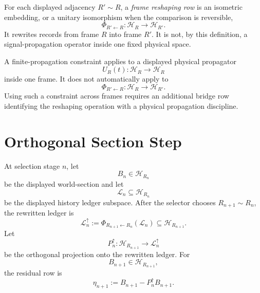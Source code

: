 \begin{definition}
\label{def:observer-centered-frame-reshaping-row}
For each displayed adjacency $R'\sim R$, a \emph{frame reshaping row} is
an isometric embedding, or a unitary isomorphism when the comparison is
reversible,
$$
\Phi_{R'\leftarrow R}:\mathcal H_R\to\mathcal H_{R'}.
$$
It rewrites records from frame $R$ into frame $R'$. It is not, by this
definition, a signal-propagation operator inside one fixed physical
space.
\end{definition}

\begin{principle}
\label{prin:observer-centered-reshaping-not-propagation}
A finite-propagation constraint applies to a displayed physical
propagator
$$
U_R(t):\mathcal H_R\to\mathcal H_R
$$
inside one frame. It does not automatically apply to
$$
\Phi_{R'\leftarrow R}:\mathcal H_R\to\mathcal H_{R'}.
$$
Using such a constraint across frames requires an additional bridge row
identifying the reshaping operation with a physical propagation
discipline.
\end{principle}


\section{Orthogonal Section Step}
\label{sec:observer-centered-orthogonal-section-step}

\begin{definition}
\label{def:observer-centered-ledger-rewrite-residual}
At selection stage $n$, let
$$
B_n\in\mathcal H_{R_n}
$$
be the displayed world-section and let
$$
\mathcal L_n\subseteq\mathcal H_{R_n}
$$
be the displayed history ledger subspace. After the selector chooses
$R_{n+1}\sim R_n$, the rewritten ledger is
$$
\mathcal L_n^{\uparrow}
:=
\Phi_{R_{n+1}\leftarrow R_n}(\mathcal L_n)
\subseteq
\mathcal H_{R_{n+1}}.
$$
Let
$$
P_n^{\uparrow}:\mathcal H_{R_{n+1}}\to\mathcal L_n^{\uparrow}
$$
be the orthogonal projection onto the rewritten ledger. For
$$
B_{n+1}\in\mathcal H_{R_{n+1}},
$$
the residual row is
$$
\eta_{n+1}
:=
B_{n+1}-P_n^{\uparrow}B_{n+1}.
$$
\end{definition}


